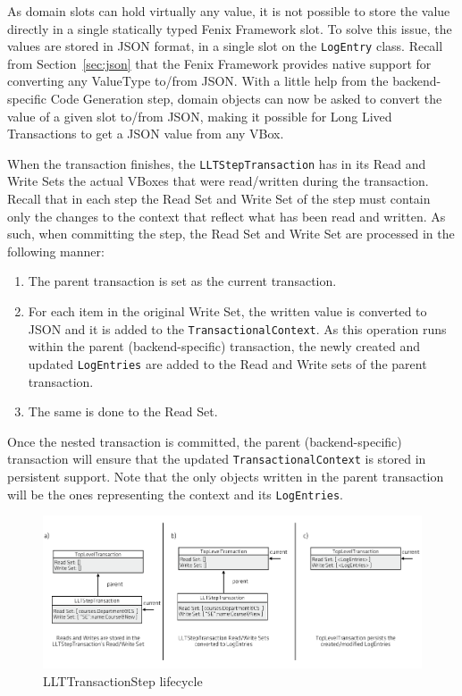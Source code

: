 \documentclass{llncs}
\begin{document}
As domain slots can hold virtually any value, it is not possible to
store the value directly in a single statically typed Fenix Framework
slot. To solve this issue, the values are stored in JSON format, in a
single slot on the \texttt{LogEntry} class. Recall from
Section~\ref{sec:json} that the Fenix Framework provides native
support for converting any ValueType to/from JSON. With a little help
from the backend-specific Code Generation step, domain objects can now
be asked to convert the value of a given slot to/from JSON, making it
possible for Long Lived Transactions to get a JSON value from any
VBox.

When the transaction finishes, the \texttt{LLTStepTransaction} has in
its Read and Write Sets the actual VBoxes that were read/written
during the transaction. Recall that in each step the Read Set and
Write Set of the step must contain only the changes to the context
that reflect what has been read and written. As such, when committing
the step, the Read Set and Write Set are processed in the following
manner:

\begin{enumerate}

\item The parent transaction is set as the current transaction.

\item For each item in the original Write Set, the written value is
  converted to JSON and it is added to the
  \texttt{TransactionalContext}. As this operation runs within the
  parent (backend-specific) transaction, the newly created and updated
  \texttt{LogEntries} are added to the Read and Write sets of the
  parent transaction.

\item The same is done to the Read Set.

\end{enumerate}

Once the nested transaction is committed, the parent
(backend-specific) transaction will ensure that the updated
\texttt{TransactionalContext} is stored in persistent support. Note
that the only objects written in the parent transaction will be the
ones representing the context and its \texttt{LogEntries}.

\begin{figure}
\centering
\includegraphics[width=.9\linewidth]{llt-step-lifecycle}
\caption{LLTTransactionStep lifecycle}
\label{fig:llt-lifecycle}
\end{figure}
\end{document}
